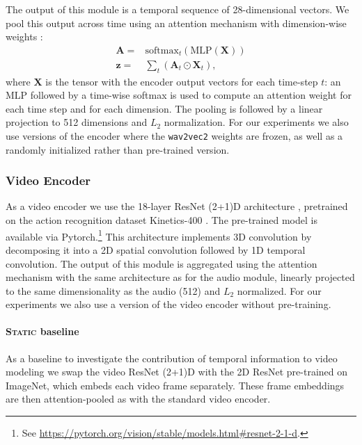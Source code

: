 The output of this module is a temporal sequence of 28-dimensional vectors. We
pool this output across time using an attention mechanism with
dimension-wise weights \citep{Merkx2019}:
\begin{equation}
  \begin{aligned}
    \mathbf{A} = & \mathrm{softmax}_t\left(\mathrm{MLP}(\mathbf{X})\right)\\
    \mathbf{z} = & \sum_t \left( \mathbf{A}_{t} \odot \mathbf{X}_{t} \right),
  \end{aligned}
  \label{eq:att-pool}
\end{equation}
where $\mathbf{X}$ is the tensor with the encoder output vectors for
each time-step $t$: an MLP followed by a time-wise
softmax is used to compute an attention weight for each time step and for each
dimension.
The pooling is followed by a linear projection to 512 dimensions and $L_2$
normalization. For our experiments we also use versions of the encoder
where the \texttt{wav2vec2} weights are frozen, as well as a randomly initialized
rather than pre-trained version.



\subsubsection{Video Encoder}
As a video encoder we use the 18-layer ResNet (2+1)D architecture
\citep{tran2018closer}, pretrained on the action recognition dataset
Kinetics-400 \citep{DBLP:journals/corr/KayCSZHVVGBNSZ17}. The
pre-trained model is available via Pytorch.\footnote{See
  \url{https://pytorch.org/vision/stable/models.html\#resnet-2-1-d}.}  This
architecture implements 3D convolution by decomposing it into a 2D
spatial convolution followed by 1D temporal convolution.  The output
of this module is aggregated using the attention mechanism with the
same architecture as for the audio module, linearly projected to the
same dimensionality as the audio (512) and $L_2$ normalized.  For our
experiments we also use a version of the video encoder without
pre-training.

\paragraph{\textsc{Static} baseline}
As a baseline to investigate the contribution of temporal information to
video modeling we swap the video ResNet (2+1)D with the 2D ResNet
pre-trained on ImageNet, which embeds each video frame
separately. These frame embeddings are then attention-pooled as with
the standard video encoder. 


